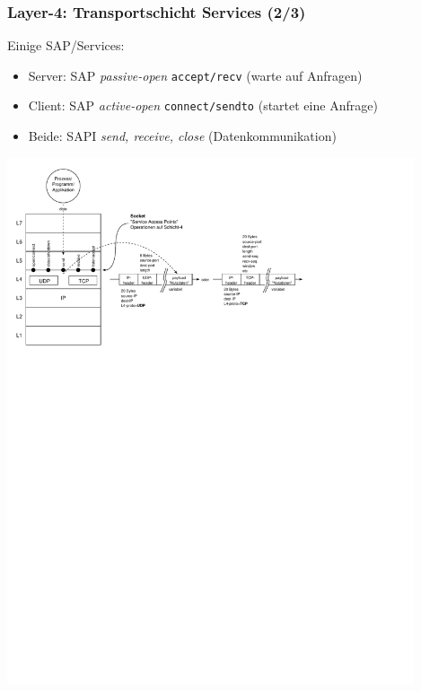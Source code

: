 \documentclass[ignorenonframetext]{beamer}
\begin{document}
\begin{frame}
\frametitle{Layer-4: Transportschicht Services (2/3)}
Einige SAP/Services:
\begin{small}
\begin{itemize}
  \item{Server: SAP \emph{passive-open} \texttt{accept/recv} (warte auf Anfragen)}
  \item{Client: SAP \emph{active-open} \texttt{connect/sendto} (startet eine Anfrage)}
  \item{Beide: SAPI \emph{send, receive, close} (Datenkommunikation)}
\end{itemize}
\end{small}
\includegraphics[height=15.5cm]{stack}
\end{frame}
\end{document}
